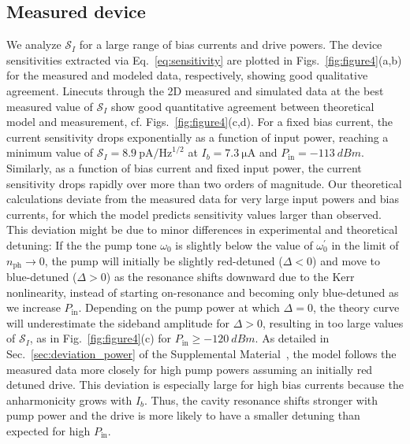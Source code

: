 \subsection{Measured device}
% 
We analyze $\mathcal{S}_I$ for a large range of bias currents and drive powers.
% 
The device sensitivities extracted via Eq.~\eqref{eq:sensitivity} are plotted in Figs.~\ref{fig:figure4}(a,b) for the measured and modeled data, respectively, showing good qualitative agreement.
% 
Linecuts through the 2D measured and simulated data at the best measured value of $\mathcal{S}_I$ show good quantitative agreement between theoretical model and measurement, cf. Figs.~\ref{fig:figure4}(c,d).
% 
For a fixed bias current, the current sensitivity drops exponentially as a function of input power, reaching a minimum value of $\mathcal{S}_I=\SI{8.9}{\pico\ampere\per\hertz\tothe{1/2}}$ at $I_b=\SI{7.3}{\micro\ampere}$ and $P_\text{in}=\SI{-113}{dBm}$.
% 
Similarly, as a function of bias current and fixed input power, the current sensitivity drops rapidly over more than two orders of magnitude.
% 
Our theoretical calculations deviate from the measured data for very large input powers and bias currents, for which the model predicts sensitivity values larger than observed.
% 
This deviation might be due to minor differences in experimental and theoretical detuning:
% 
If the the pump tone $\omega_0$ is slightly below the value of $\omega_0^\prime$ in the limit of $n_\text{ph}\rightarrow0$, the pump will initially be slightly red-detuned ($\Delta<0$) and move to blue-detuned ($\Delta>0$) as the resonance shifts downward due to the Kerr nonlinearity, instead of starting on-resonance and becoming only blue-detuned as we increase $P_\text{in}$.
% 
Depending on the pump power at which $\Delta=0$, the theory curve will underestimate the sideband amplitude for $\Delta>0$, resulting in too large values of $\mathcal{S}_I$, as in Fig.~\ref{fig:figure4}(c) for $P_\text{in}\geq\SI{-120}{dBm}$.
% 
As detailed in Sec.~\ref{sec:deviation_power} of the Supplemental Material~\cite{SeeSupplementalMaterial}, the model follows the measured data more closely for high pump powers assuming an initially red detuned drive.
% 
This deviation is especially large for high bias currents because the anharmonicity grows with $I_b$.
% 
Thus, the cavity resonance shifts stronger with pump power and the drive is more likely to have a smaller detuning than expected for high $P_\text{in}$.



